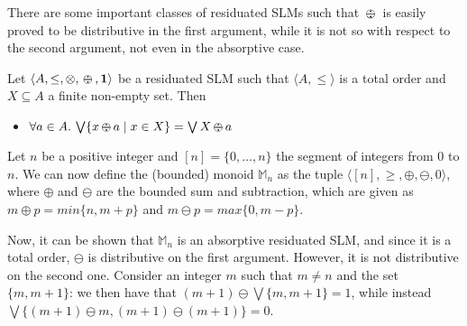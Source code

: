 \documentclass{llncs}
\newcommand{\shortNoProof}[1]{ }
\def\monid{{\mathbf 0}}
\def\monop{\otimes}
\def\odiv{\, {\ominus\hspace{-7.7pt} \div} \,}
\def\monid{\mathbf{1}}
\begin{document}

There are some important classes of residuated SLMs  such that $\odiv$ is easily proved to be distributive in the first argument,
while it is not so with respect to the second argument, not even in the absorptive case.

\begin{lemma}
	\label{distodiv2}
	Let $\langle A, \leq, \monop, \odiv, \monid \rangle$ be a residuated SLM such that $\langle A, \leq \rangle$ is a total order and $X \subseteq A$ a finite non-empty set. Then 
	\begin{itemize}
		\item $\forall a \in A.\, \bigvee \{ x \odiv a \mid x \in X \} = \bigvee X \odiv a$
	\end{itemize}	
\end{lemma}

\shortNoProof{
\begin{proof}
If $\langle A, \leq \rangle$ is a total order and $X$ is finite and non-empty we have that $\bigvee X \in X$, and since $\odiv$ 
is monotone on the first argument (see Lemma~\ref{mono}) the result follows.
\qed
\end{proof}
}

\begin{example}
\label{nodist2}
%
Let $n$ be a positive integer and $[n] = \{0, \ldots, n\}$ the segment of integers from $0$ to $n$. We can now define the (bounded) monoid $\mathbb{M}_n$ 
as the tuple $\langle [n], \geq, \oplus, \ominus, 0 \rangle$, where $\oplus$ and $\ominus$ are the bounded sum and subtraction, 
which are given as $m\oplus p = min\{n, m+p\}$ and $m\ominus p = max\{0,m-p\}$.

Now, it can be shown that $\mathbb{M}_n$ is an absorptive residuated SLM, and since it is a total order,
$\ominus$ is  distributive on the first argument.
%
However, it is not distributive on the second one. Consider an integer $m$ such that 
$m \neq n$ and the set $\{m, m+1\}$:
we then have that $(m+1) \ominus \bigvee\{m, m+1\} = 1$,
while instead $\bigvee\{(m+1) \ominus m, (m+1) \ominus (m+1)\} = 0$.
\end{example}
\end{document}
